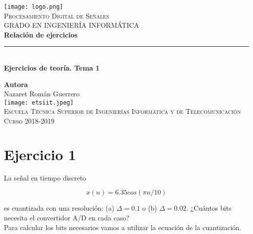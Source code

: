 \documentclass[11pt,a4paper]{article}
\begin{document}
\begin{titlepage}

\begin{minipage}{\textwidth}

\centering
\texttt{[image: logo.png]}\\

\textsc{\Large Procesamiento Digital de Señales\\[0.2cm]}
\textsc{GRADO EN INGENIERÍA INFORMÁTICA}\\[1cm]

{\Huge\bfseries Relación de ejercicios\\}
\noindent\rule[-1ex]{\textwidth}{3pt}\\[3.5ex]
{\large\bfseries Ejercicios de teoría. Tema 1}
\end{minipage}

\vspace{1.5cm}
\begin{minipage}{\textwidth}
\centering

\textbf{Autora}\\ {Nazaret Román Guerrero}\\[2.5ex]
\texttt{[image: etsiit.jpeg]}\\[0.1cm]
\vspace{1cm}
\textsc{Escuela Técnica Superior de Ingenierías Informática y de Telecomunicación}\\
\vspace{1cm}
\textsc{Curso 2018-2019}
\end{minipage}
\end{titlepage}

\tableofcontents
\thispagestyle{empty}

\newpage

\section{Ejercicio 1}

La señal en tiempo discreto

\[x(n)=6.35cos(\pi n/10) \]

es cuantizada con una resolución: (a) $\Delta = 0.1$ o (b) $\Delta = 0.02$. ¿Cuántos bits necesita el convertidor A/D en cada caso?\\

Para calcular los bits necesarios vamos a utilizar la ecuación de la cuantización.
\end{document}
